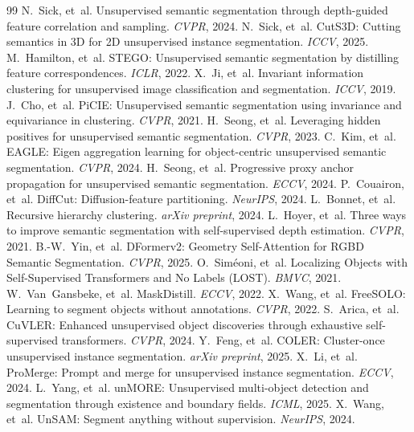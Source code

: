 \documentclass{article}
\begin{document}
\begin{thebibliography}{99}
 N.~Sick, et~al. Unsupervised semantic segmentation through depth-guided feature correlation and sampling. \emph{CVPR}, 2024.
 N.~Sick, et~al. CutS3D: Cutting semantics in 3D for 2D unsupervised instance segmentation. \emph{ICCV}, 2025.
 M.~Hamilton, et~al. STEGO: Unsupervised semantic segmentation by distilling feature correspondences. \emph{ICLR}, 2022.
 X.~Ji, et~al. Invariant information clustering for unsupervised image classification and segmentation. \emph{ICCV}, 2019.
 J.~Cho, et~al. PiCIE: Unsupervised semantic segmentation using invariance and equivariance in clustering. \emph{CVPR}, 2021.
 H.~Seong, et~al. Leveraging hidden positives for unsupervised semantic segmentation. \emph{CVPR}, 2023.
 C.~Kim, et~al. EAGLE: Eigen aggregation learning for object-centric unsupervised semantic segmentation. \emph{CVPR}, 2024.
 H.~Seong, et~al. Progressive proxy anchor propagation for unsupervised semantic segmentation. \emph{ECCV}, 2024.
 P.~Couairon, et~al. DiffCut: Diffusion-feature partitioning. \emph{NeurIPS}, 2024.
 L.~Bonnet, et~al. Recursive hierarchy clustering. \emph{arXiv preprint}, 2024.
 L.~Hoyer, et~al. Three ways to improve semantic segmentation with self-supervised depth estimation. \emph{CVPR}, 2021.
 B.-W.~Yin, et~al. DFormerv2: Geometry Self-Attention for RGBD Semantic Segmentation. \emph{CVPR}, 2025.
 O.~Sim\'eoni, et~al. Localizing Objects with Self-Supervised Transformers and No Labels (LOST). \emph{BMVC}, 2021.
 W.~Van~Gansbeke, et~al. MaskDistill. \emph{ECCV}, 2022.
 X.~Wang, et~al. FreeSOLO: Learning to segment objects without annotations. \emph{CVPR}, 2022.
 S.~Arica, et~al. CuVLER: Enhanced unsupervised object discoveries through exhaustive self-supervised transformers. \emph{CVPR}, 2024.
 Y.~Feng, et~al. COLER: Cluster-once unsupervised instance segmentation. \emph{arXiv preprint}, 2025.
 X.~Li, et~al. ProMerge: Prompt and merge for unsupervised instance segmentation. \emph{ECCV}, 2024.
 L.~Yang, et~al. unMORE: Unsupervised multi-object detection and segmentation through existence and boundary fields. \emph{ICML}, 2025.
 X.~Wang, et~al. UnSAM: Segment anything without supervision. \emph{NeurIPS}, 2024.

\end{thebibliography}
\end{document}
